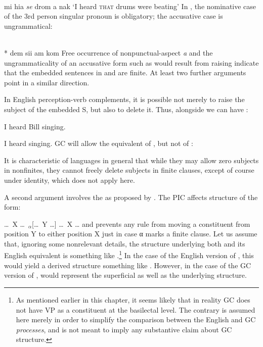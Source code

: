 \ea\label{ex:2:134}
\ili{\langGC}{}{}\\
mi hia \textit{se} drom a nak
\glt `I heard {\scshape that} drums were beating'
\z
In , the nominative case of the 3rd person singular pronoun is obligatory; the accusative case is ungrammatical:

\ea\label{ex:2:135}
\ili{\langGC}{}{}\\
\textnormal{*} dem sii am kom
\z
Free occurrence of nonpunctual-aspect \textit{a} and the ungrammaticality of an accusative form such as would result from raising indicate that the embedded sentences in  and  are finite. At least two further arguments point in a similar direction.

In English perception-verb complements, it is possible not merely to raise the subject of the embedded S, but also to delete it. Thus, alongside  we can have :

\ea\label{ex:2:136}I heard Bill singing.\z

\ea\label{ex:2:137}I heard singing.\z
GC will allow the equivalent of , but not of :

\z

\z
It is characteristic of languages in general that while they may allow zero subjects in nonfinites, they cannot freely delete subjects in finite clauses, except of course under identity, which does not apply here.

A second argument involves the  as proposed by \citet{Chomsky1977}. The PIC affects structure of the form:

\ea\label{ex:2:140}\ldots~X \ldots~$_{\alpha}$[\ldots~Y \ldots] \ldots~X \ldots \z
and prevents any rule from moving a constituent from position Y to either position X just in case α marks a finite clause. Let us assume that, ignoring some nonrelevant details, the structure underlying both  and its English equivalent is something like .\footnote{As mentioned earlier in this chapter, it seems likely that in reality GC does not have VP as a constituent at the basilectal level. The contrary is assumed here merely in order to simplify the comparison between the English and GC \textit{processes}, and is not meant to imply any substantive claim about GC structure.} In the case of the English version of , this would yield a derived structure something like . However, in the case of the GC version of ,  would represent the superficial as well as the underlying structure.

